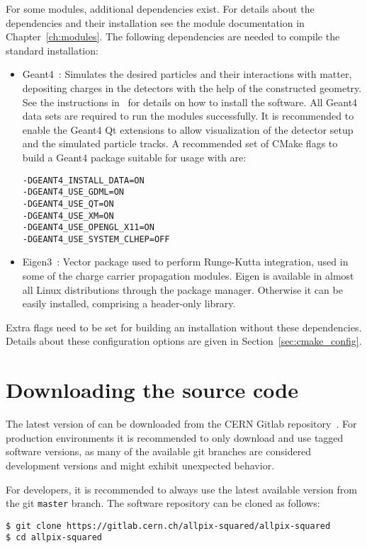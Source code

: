 For some modules, additional dependencies exist.
For details about the dependencies and their installation see the module documentation in Chapter~\ref{ch:modules}.
The following dependencies are needed to compile the standard installation:
\begin{itemize}
\item Geant4~\cite{geant4}: Simulates the desired particles and their interactions with matter, depositing charges in the detectors with the help of the constructed geometry.
See the instructions in~\cite{geant4installation} for details on how to install the software.
All Geant4 data sets are required to run the modules successfully.
It is recommended to enable the Geant4 Qt extensions to allow visualization of the detector setup and the simulated particle tracks.
A recommended set of CMake flags to build a Geant4 package suitable for usage with \apsq are:
\begin{verbatim}
-DGEANT4_INSTALL_DATA=ON
-DGEANT4_USE_GDML=ON
-DGEANT4_USE_QT=ON
-DGEANT4_USE_XM=ON
-DGEANT4_USE_OPENGL_X11=ON
-DGEANT4_USE_SYSTEM_CLHEP=OFF
\end{verbatim}
\item Eigen3~\cite{eigen3}: Vector package used to perform Runge-Kutta integration, used in some of the charge carrier propagation modules.
Eigen is available in almost all Linux distributions through the package manager.
Otherwise it can be easily installed, comprising a header-only library.
\end{itemize}
Extra flags need to be set for building an \apsq installation without these dependencies.
Details about these configuration options are given in Section~\ref{sec:cmake_config}.

\section{Downloading the source code}
The latest version of \apsq can be downloaded from the CERN Gitlab repository~\cite{ap2-repo}.
For production environments it is recommended to only download and use tagged software versions, as many of the available git branches are considered development versions and might exhibit unexpected behavior.

For developers, it is recommended to always use the latest available version from the git \texttt{master} branch.
The software repository can be cloned as follows:

\begin{verbatim}
$ git clone https://gitlab.cern.ch/allpix-squared/allpix-squared
$ cd allpix-squared
\end{verbatim}

